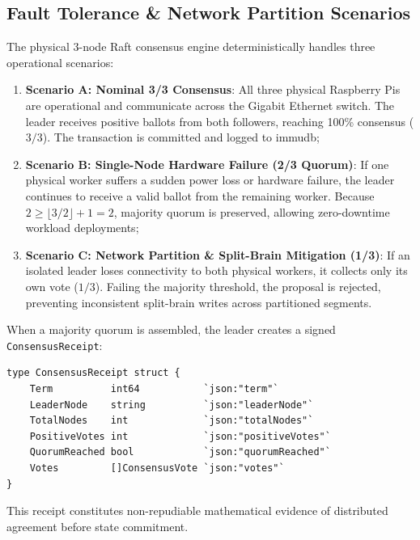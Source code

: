 \documentclass[a4paper,12pt]{article}
\begin{document}
\subsection{Fault Tolerance \& Network Partition Scenarios}

The physical 3-node Raft consensus engine deterministically handles three operational scenarios:
\begin{enumerate}[leftmargin=1.2cm]
    \item \textbf{Scenario A: Nominal 3/3 Consensus}: All three physical Raspberry Pis are operational and communicate across the Gigabit Ethernet switch. The leader receives positive ballots from both followers, reaching 100\% consensus ($3/3$). The transaction is committed and logged to immudb;
    \item \textbf{Scenario B: Single-Node Hardware Failure (2/3 Quorum)}: If one physical worker suffers a sudden power loss or hardware failure, the leader continues to receive a valid ballot from the remaining worker. Because $2 \ge \lfloor 3/2 \rfloor + 1 = 2$, majority quorum is preserved, allowing zero-downtime workload deployments;
    \item \textbf{Scenario C: Network Partition \& Split-Brain Mitigation (1/3)}: If an isolated leader loses connectivity to both physical workers, it collects only its own vote ($1/3$). Failing the majority threshold, the proposal is rejected, preventing inconsistent split-brain writes across partitioned segments.
\end{enumerate}

When a majority quorum is assembled, the leader creates a signed \texttt{ConsensusReceipt}:
\begin{lstlisting}[language=golang]
type ConsensusReceipt struct {
    Term          int64           `json:"term"`
    LeaderNode    string          `json:"leaderNode"`
    TotalNodes    int             `json:"totalNodes"`
    PositiveVotes int             `json:"positiveVotes"`
    QuorumReached bool            `json:"quorumReached"`
    Votes         []ConsensusVote `json:"votes"`
}
\end{lstlisting}
This receipt constitutes non-repudiable mathematical evidence of distributed agreement before state commitment.

\newpage

\end{document}
